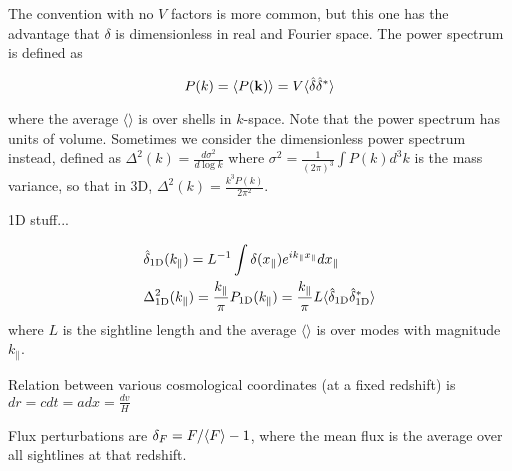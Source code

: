 \documentclass[twocolumn]{article}
\begin{document}
The convention with no $V$ factors is more common, but this one has the
advantage that $\delta$ is dimensionless in real and Fourier space. The power
spectrum is defined as

\begin{equation}
  P(k) = \langle P(\mathbf{k}) \rangle = V \langle \hat{\delta} \hat{\delta}^* \rangle
\end{equation}

where the average $\langle \rangle$ is over shells in $k$-space. Note that the
power spectrum has units of volume. Sometimes we consider the dimensionless
power spectrum instead, defined as $\Delta^2(k) = \frac{d \sigma^2}{d \log k}$
where $\sigma^2 = \frac{1}{(2 \pi)^3} \int P(k) d^3k$ is the mass variance, so
that in 3D, $\Delta^2(k) = \frac{k^3 P(k)}{2 \pi^2}$.

1D stuff...

\begin{equation}
  \begin{aligned}
    & \hat{\delta}_{\rm 1D}(k_\parallel)
      = L^{-1} \int \delta(x_\parallel)
        e^{i k_\parallel x_\parallel} dx_\parallel \\
    & \Delta^2_{\rm 1D}(k_\parallel)
      = \frac{k_\parallel}{\pi} P_{\rm 1D}(k_\parallel)
      = \frac{k_\parallel}{\pi} L
        \langle \hat{\delta}_{\rm 1D} \hat{\delta}_{\rm 1D}^* \rangle \\
  \end{aligned}
\end{equation}
where $L$ is the sightline length and the average $\langle \rangle$ is over
modes with magnitude $k_\parallel$.

Relation between various cosmological coordinates (at a fixed redshift) is
$dr = c dt = a dx = \frac{dv}{H}$

Flux perturbations are $\delta_F = F / \langle F \rangle - 1$, where the mean flux is
the average over all sightlines at that redshift.





\end{document}
